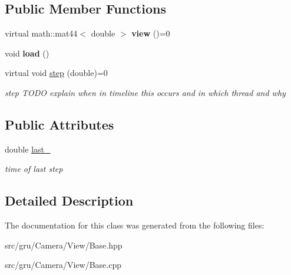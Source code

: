 \subsection*{\-Public \-Member \-Functions}
\begin{DoxyCompactItemize}
\item 
\hypertarget{classglutpp_1_1Camera_1_1View_1_1Base_ac1bcaaff95e5b689756a19ef54c859ca}{virtual math\-::mat44$<$ double $>$ {\bfseries view} ()=0}\label{classglutpp_1_1Camera_1_1View_1_1Base_ac1bcaaff95e5b689756a19ef54c859ca}

\item 
\hypertarget{classglutpp_1_1Camera_1_1View_1_1Base_aa50111a2f1afe732fb01a073b35cc0c0}{void {\bfseries load} ()}\label{classglutpp_1_1Camera_1_1View_1_1Base_aa50111a2f1afe732fb01a073b35cc0c0}

\item 
\hypertarget{classglutpp_1_1Camera_1_1View_1_1Base_abce83ff7d7f2b50811489ff85cd870c7}{virtual void \hyperlink{classglutpp_1_1Camera_1_1View_1_1Base_abce83ff7d7f2b50811489ff85cd870c7}{step} (double)=0}\label{classglutpp_1_1Camera_1_1View_1_1Base_abce83ff7d7f2b50811489ff85cd870c7}

\begin{DoxyCompactList}\small\item\em step \-T\-O\-D\-O explain when in timeline this occurs and in which thread and why \end{DoxyCompactList}\end{DoxyCompactItemize}
\subsection*{\-Public \-Attributes}
\begin{DoxyCompactItemize}
\item 
\hypertarget{classglutpp_1_1Camera_1_1View_1_1Base_a2f131c109db4a70bbfdf9fdf38891e52}{double \hyperlink{classglutpp_1_1Camera_1_1View_1_1Base_a2f131c109db4a70bbfdf9fdf38891e52}{last\-\_\-}}\label{classglutpp_1_1Camera_1_1View_1_1Base_a2f131c109db4a70bbfdf9fdf38891e52}

\begin{DoxyCompactList}\small\item\em time of last step \end{DoxyCompactList}\end{DoxyCompactItemize}


\subsection{\-Detailed \-Description}


\-The documentation for this class was generated from the following files\-:\begin{DoxyCompactItemize}
\item 
src/gru/\-Camera/\-View/\-Base.\-hpp\item 
src/gru/\-Camera/\-View/\-Base.\-cpp\end{DoxyCompactItemize}

